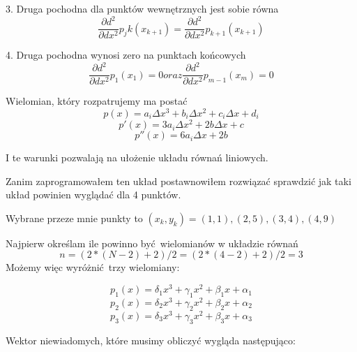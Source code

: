 \documentclass[varwidth,12pt,a4paper]{article}
\begin{document}
3. Druga pochodna dla punktów wewnętrznych jest sobie równa
\begin{equation}
     \frac{\partial d^2}{\partial dx^2} p_jk (x_{k+1}) = \frac{\partial d^2}{\partial dx^2} p_{k+1} (x_{k+1})
\end{equation}

4. Druga pochodna wynosi zero na punktach końcowych
\begin{equation}
     \frac{\partial d^2}{\partial dx^2} p_1 (x_{1}) = 0 oraz \frac{\partial d^2}{\partial dx^2} p_{m-1} (x_{m}) = 0
\end{equation}

Wielomian, który rozpatrujemy ma postać
\begin{equation}
    p(x) = a_i \Delta x^3 + b_i \Delta x^2 + c_i \Delta x + d_i
\end{equation}
\begin{equation}
    p'(x) = 3 a_i \Delta x^2 + 2b \Delta x + c
\end{equation}
\begin{equation}
    p''(x) = 6 a_i \Delta x + 2b
\end{equation}

I te warunki pozwalają na ułożenie układu równań liniowych.

Zanim zaprogramowałem ten układ postawnowiłem rozwiązać sprawdzić jak taki układ powinien wyglądać dla 4 punktów.

Wybrane przeze mnie punkty to $(x_k, y_k)  = (1,1), (2,5), (3,4), (4, 9) $

Najpierw określam ile powinno być wielomianów w układzie równań 
\begin{equation}
n=(2*(N-2)+2)/2 = (2*(4-2)+2)/2 = 3 
\end{equation}
Możemy więc wyróżnić trzy wielomiany:

\begin{equation}
    p_1(x) = \delta _1 x^3 + \gamma _1 x^2 + \beta _1 x + \alpha _1
\end{equation}
\begin{equation}
    p_2(x) = \delta _2 x^3 + \gamma _2 x^2 + \beta _2 x + \alpha _2
\end{equation}
\begin{equation}
    p_3(x) = \delta _3 x^3 + \gamma _3 x^2 + \beta _3 x + \alpha _3
\end{equation}

Wektor niewiadomych, które musimy obliczyć wygląda następująco:
\begin{equation}
    [\delta _1, \delta_2, \delta_3, \gamma _1, \gamma _2, \gamma_3, \beta _1, \beta _2, \beta _3, \alpha _1, \alpha _2, \alpha _3 ]
\end{equation}
\end{document}
